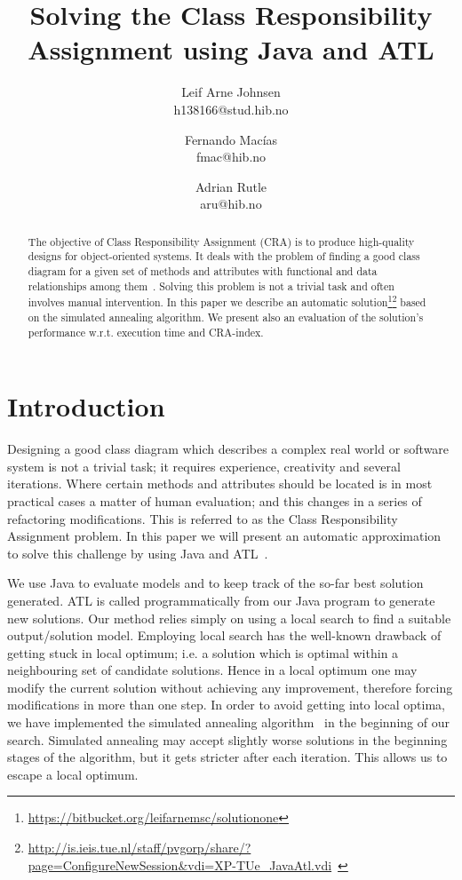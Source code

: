 \documentclass[a4paper]{article}
\title{Solving the Class Responsibility Assignment using Java and ATL}
\author{
Leif Arne Johnsen \\ h138166@stud.hib.no
\and
Fernando Macías \\ fmac@hib.no
\and
Adrian Rutle \\ aru@hib.no
}
\begin{document}
\maketitle

\begin{abstract}
The objective of Class Responsibility Assignment (CRA) is to produce high-quality designs for object-oriented systems. 
It deals with the problem of finding a good class diagram for a given set of methods and attributes with functional and data
relationships among them~\cite{BowmanBL10}.
Solving this problem is not a trivial task and often involves manual intervention.
In this paper we describe an automatic solution\footnote{\url{https://bitbucket.org/leifarnemsc/solutionone}}\footnote{\url{http://is.ieis.tue.nl/staff/pvgorp/share/?page=ConfigureNewSession\&vdi=XP-TUe_JavaAtl.vdi}~\cite{XPTUeJavaAtlvdi}} based on the simulated annealing algorithm.
We present also an evaluation of the solution's performance w.r.t. execution time and CRA-index.
\end{abstract}


\section{Introduction}

Designing a good class diagram which describes a complex real world or software system is not a trivial task; it requires experience, creativity and several iterations.
Where certain methods and attributes should be located is in most practical cases a matter of human evaluation; and this changes in a series of refactoring modifications.
This is referred to as the Class Responsibility Assignment problem.
In this paper we will present an automatic approximation to solve this challenge by using Java and ATL~\cite{ATL}.

We use Java to evaluate models and to keep track of
the so-far best solution generated.
ATL is called programmatically from our Java program to generate new solutions.
Our method relies simply on using a local search to find a suitable output/solution model.
Employing local search has the well-known drawback of getting stuck in local optimum; i.e. a solution which is optimal within a neighbouring set of candidate solutions.
Hence in a local optimum one may modify the current solution without achieving any improvement, therefore forcing modifications in more than one step.
In order to avoid getting into local optima, we have implemented the simulated annealing algorithm~\cite{Annealing} in the beginning of our search.
Simulated annealing may accept slightly worse solutions in the beginning stages of the algorithm, but it gets stricter after each iteration.
This allows us to escape a local optimum.
\end{document}
